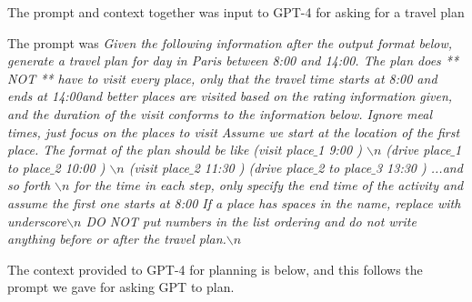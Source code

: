 \documentclass[doubleblind]{ecai}
\newcommand{\gpt}{{\sc GPT-4}\xspace}
\begin{document}
The prompt and context together was input to \gpt for asking for a travel plan

The prompt was
\textit{Given the following information after the output format below, generate a travel plan for day in Paris between 8:00 and 14:00. The plan does ** NOT ** have to visit every place, only that the travel time starts at 8:00 and ends at 14:00and better places are visited based on the rating information given, and the duration of the visit conforms to the information below. 
Ignore meal times, just focus on the places to visit
Assume we start at the location of the first place. The format of the plan should be like
 (visit place$\_$1 9:00 ) $\backslash{n}$ (drive place$\_$1 to place$\_$2 10:00 ) $\backslash{n}$ (visit place$\_$2 11:30 ) (drive place$\_$2 to place$\_$3 13:30 ) ...and so forth $\backslash{n}$ 
 for the time in each step, only specify the end time of the activity and assume the first one starts at 8:00 
 If a place has spaces in the name, replace with underscore$\backslash{n}$          
 DO NOT put numbers in the list ordering and do not write anything before or after the travel plan.$\backslash{n}$}



The context provided to \gpt for planning is below, and this follows the prompt we gave for asking GPT to plan.
\end{document}
